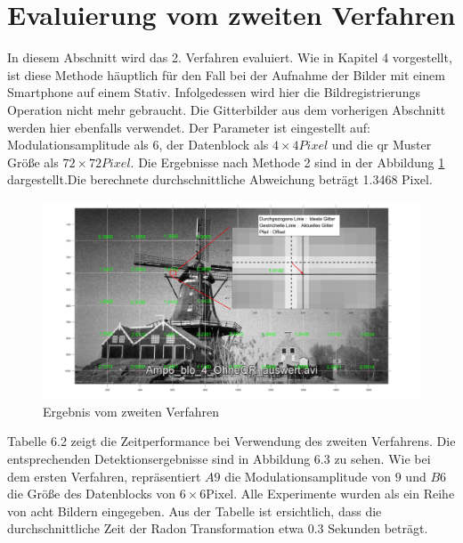 \section{Evaluierung vom zweiten Verfahren}

In diesem Abschnitt wird das 2. Verfahren evaluiert. Wie in Kapitel 4 vorgestellt, ist diese Methode häuptlich für den Fall bei der Aufnahme der Bilder mit einem Smartphone auf einem Stativ. Infolgedessen wird hier die Bildregistrierungs Operation nicht mehr gebraucht. Die Gitterbilder aus dem vorherigen Abschnitt werden hier ebenfalls verwendet. Der Parameter ist eingestellt auf: Modulationsamplitude als 6, der Datenblock als $ 4 \times 4 Pixel$ und die \gls{qr} Muster Größe als $ 72 \times 72 Pixel $. Die Ergebnisse nach Methode 2 sind in der Abbildung \ref{fig:Ergebnis2} dargestellt.Die berechnete durchschnittliche Abweichung beträgt 1.3468 Pixel. 
\begin{figure}[H]
 \centering 
  \includegraphics[keepaspectratio,width=1.00\textwidth]{images/6_Auswertung/Ergebnis2.pdf}
 \caption{Ergebnis vom zweiten Verfahren}
 \label{fig:Ergebnis2}
\end{figure}

Tabelle 6.2 zeigt die Zeitperformance bei Verwendung des zweiten Verfahrens. Die entsprechenden Detektionsergebnisse sind in Abbildung 6.3 zu sehen. Wie bei dem ersten Verfahren, repräsentiert $ A9 $
die Modulationsamplitude von $ 9 $ und $ B6 $ die Größe des Datenblocks von $ 6 \times 6 $Pixel. Alle Experimente wurden als ein Reihe von acht Bildern eingegeben. Aus der Tabelle ist ersichtlich, dass die durchschnittliche Zeit der Radon Transformation etwa 0.3 Sekunden beträgt.

